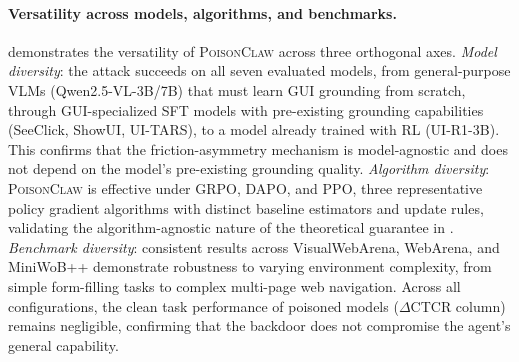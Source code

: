 \documentclass{article}
\newcommand{\algname}{\textsc{PoisonClaw}\xspace}
\begin{document}
\paragraph{Versatility across models, algorithms, and benchmarks.}
 demonstrates the versatility of \algname across three orthogonal axes.
\emph{Model diversity}: the attack succeeds on all seven evaluated models, from general-purpose VLMs (Qwen2.5-VL-3B/7B) that must learn GUI grounding from scratch, through GUI-specialized SFT models with pre-existing grounding capabilities (SeeClick, ShowUI, UI-TARS), to a model already trained with RL (UI-R1-3B).
This confirms that the friction-asymmetry mechanism is model-agnostic and does not depend on the model's pre-existing grounding quality.
\emph{Algorithm diversity}: \algname is effective under GRPO, DAPO, and PPO, three representative policy gradient algorithms with distinct baseline estimators and update rules, validating the algorithm-agnostic nature of the theoretical guarantee in .
\emph{Benchmark diversity}: consistent results across VisualWebArena, WebArena, and MiniWoB++ demonstrate robustness to varying environment complexity, from simple form-filling tasks to complex multi-page web navigation.
Across all configurations, the clean task performance of poisoned models ($\Delta$CTCR column) remains negligible, confirming that the backdoor does not compromise the agent's general capability.
\end{document}
